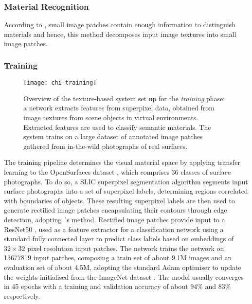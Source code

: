 \subsubsection{Material Recognition}
According to \cite{schwartz2019recognizing}, small image patches contain enough information to distinguish materials and hence, this method decomposes input image textures into small image patches.
\subsubsection{Training}
\begin{figure}[htbp]
    \centering
    \texttt{[image: chi-training]}
    \caption[Texture-based material recognition system --- training phase]{Overview of the texture-based system set up for the \emph{training} phase: a network extracts features from superpixel data, obtained from image textures from scene objects in virtual environments. Extracted features are used to classify semantic materials. The system trains on a large dataset of annotated image patches gathered from in-the-wild photographs of real surfaces.}
    \label{fig:texture-tagging-training}
\end{figure}
The training pipeline determines the visual material space by applying transfer learning to the OpenSurfaces dataset \citep{bell2013opensurfaces}, which comprises 36 classes of surface photographs. To do so, a SLIC superpixel segmentation algorithm \citep{slic6205760} segments input surface photographs into a set of superpixel labels, determining regions correlated with boundaries of objects. These resulting superpixel labels are then used to generate rectified image patches encapsulating their contours through edge detection, adopting~\cite{ding2001canny}'s method.
Rectified image patches provide input to a ResNet50 \citep{he2016deep}, used as a feature extractor for a classification network using a standard fully connected layer to predict class labels based on embeddings of $32\times32$ pixel resolution input patches. The network trains the network on \num{13677819} input patches, composing a train set of about 9.1M images and an evaluation set of about 4.5M, adopting the standard Adam optimiser \citep{kingma2014adam} to update the weights initialised from the ImageNet dataset \citep{deng2009imagenet}. The model usually converges in 45 epochs with a training and validation accuracy of about $94\%$ and $83\%$ respectively. 

